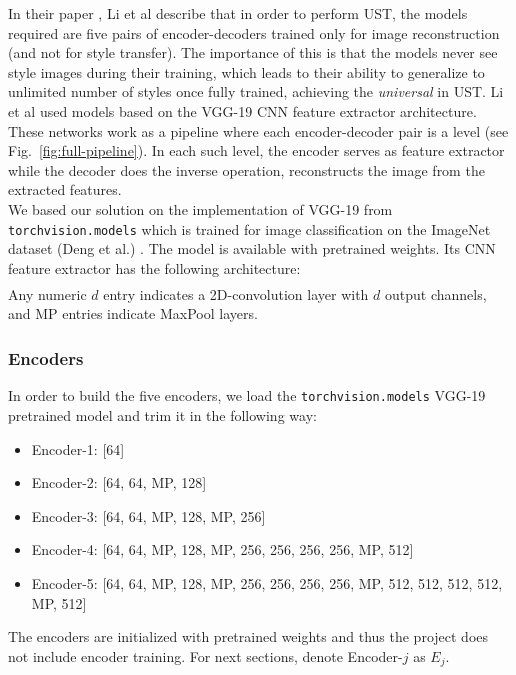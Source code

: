 \hspace{0.5cm} In their paper \cite{bib11}, Li et al describe that in order to perform UST, the models required are five pairs of encoder-decoders trained only for image reconstruction (and not for style transfer). The importance of this is that the models never see style images during their training, which leads to their ability to generalize to unlimited number of styles once fully trained, achieving the \textit{universal} in UST. Li et al used models based on the VGG-19 CNN feature extractor architecture. These networks work as a pipeline where each encoder-decoder pair is a level (see Fig.~\ref{fig:full-pipeline}). In each such level, the encoder serves as feature extractor while the decoder does the inverse operation, reconstructs the image from the extracted features.\\
We based our solution on the implementation of VGG-19 \cite{bib20} from \texttt{torchvision.models} which is trained for image classification on the ImageNet dataset (Deng et al.) \cite{bib21}. The model is available with pretrained weights. Its CNN feature extractor has the following architecture:
\begin{gather*}
[64, 64, MP, 128, 128, MP, 256, 256, 256, 256, MP, 512, 512, 512, 512, MP, 512, 512, 512, 512, MP]
\end{gather*}
Any numeric $d$ entry indicates a 2D-convolution layer with $d$ output channels, and MP entries indicate MaxPool layers.

\subsubsection{Encoders}\label{subsec:Encoders}
In order to build the five encoders, we load the \texttt{torchvision.models} VGG-19 pretrained model and trim it in the following way:
\begin{itemize}
	\item Encoder-1: [64]
	\item Encoder-2: [64, 64, MP, 128]
	\item Encoder-3: [64, 64, MP, 128, MP, 256]
	\item Encoder-4: [64, 64, MP, 128, MP, 256, 256, 256, 256, MP, 512]
	\item Encoder-5: [64, 64, MP, 128, MP, 256, 256, 256, 256, MP, 512, 512, 512, 512, MP, 512]
\end{itemize}
The encoders are initialized with pretrained weights and thus the project does not include encoder training. For next sections, denote Encoder-$j$ as $E_j$.

